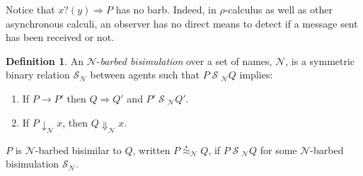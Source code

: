 \documentclass[]{amsart}
\makeatletter
\newcommand{\concat}{\Rightarrow}
\newcommand{\nameeq}{\mathbin{\equiv_N}}
\newcommand{\prefix}[3]{#1 ? ( #2 ) \concat #3}
\newcommand{\lift}[2]{#1 ! ( #2 )}
\newcommand{\quotep}[1]{@#1}
\newcommand{\red}{\rightarrow}
\newcommand{\wred}{\Rightarrow}
\newcommand{\parop}{\;|\;}		%
\newcommand{\rel}[1]{\;{\mathcal #1}\;} %
\newcommand{\wbbisim}{\stackrel{\centerdot}{\approx}} %
\newcommand{\fwbeq}{\stackrel{\circ}{\approx}}	%
\newcommand{\wbeq}{\approx}	%
\newtheorem{lem}[thm]{Lemma}
\theoremstyle{definition}
\newtheorem{defn}[thm]{Definition}
\theoremstyle{remark}
\newtheorem{rem}[thm]{Remark}
\numberwithin{equation}{subsection}
\newcommand{\rhoc}{$\rho$-calculus}
\makeatother
\begin{document}
Notice that $\prefix{x}{y}{P}$ has no barb.  Indeed, in {\rhoc} as well
as other asynchronous calculi, an observer has no direct means to
detect if a message sent has been received or not.

\begin{defn}
An  ${\mathcal N}$-\emph{barbed bisimulation} over a set of names, ${\mathcal N}$, is a symmetric binary relation 
${\mathcal S}_{\mathcal N}$ between agents such that $P\rel{S}_{\mathcal N}Q$ implies:
\begin{enumerate}
\item If $P \red P'$ then $Q \wred Q'$ and $P'\rel{S}_{\mathcal N} Q'$.
\item If $P\downarrow_{\mathcal N} x$, then $Q\Downarrow_{\mathcal N} x$.
\end{enumerate}
$P$ is ${\mathcal N}$-barbed bisimilar to $Q$, written
$P \wbbisim_{\mathcal N} Q$, if $P \rel{S}_{\mathcal N} Q$ for some ${\mathcal N}$-barbed bisimulation ${\mathcal S}_{\mathcal N}$.
\end{defn}





\end{document}
